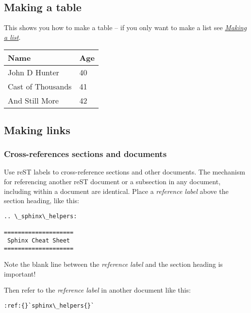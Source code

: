\documentclass[letterpaper,10pt,openany, oneside]{sphinxmanual}
\begin{document}
\subsection{Making a table}
\label{sample:id2}\label{sample:making-a-table}
This shows you how to make a table -- if you only want to make a list
see {\hyperref[sample:making-a-list]{\emph{Making a list}}}.

\begin{tabulary}{\linewidth}{|L|L|}
\hline
\textbf{
Name
} & \textbf{
Age
}\\\hline

John D Hunter
 & 
40
\\\hline

Cast of Thousands
 & 
41
\\\hline

And Still More
 & 
42
\\\hline
\end{tabulary}



\subsection{Making links}
\label{sample:id3}\label{sample:making-links}

\subsubsection{Cross-references sections and documents}
\label{sample:cross-references-sections-and-documents}
Use reST labels to cross-reference sections and other documents. The
mechanism for referencing another reST document or a subsection in any
document, including within a document are identical. Place a
\emph{reference label} above the section heading, like this:

\begin{Verbatim}[commandchars=\\\{\}]
.. \_sphinx\_helpers:

====================
 Sphinx Cheat Sheet
====================
\end{Verbatim}

Note the blank line between the \emph{reference label} and the section
heading is important!

Then refer to the \emph{reference label} in another
document like this:

\begin{Verbatim}[commandchars=\\\{\}]
:ref:{}`sphinx\_helpers{}`
\end{Verbatim}
\end{document}
